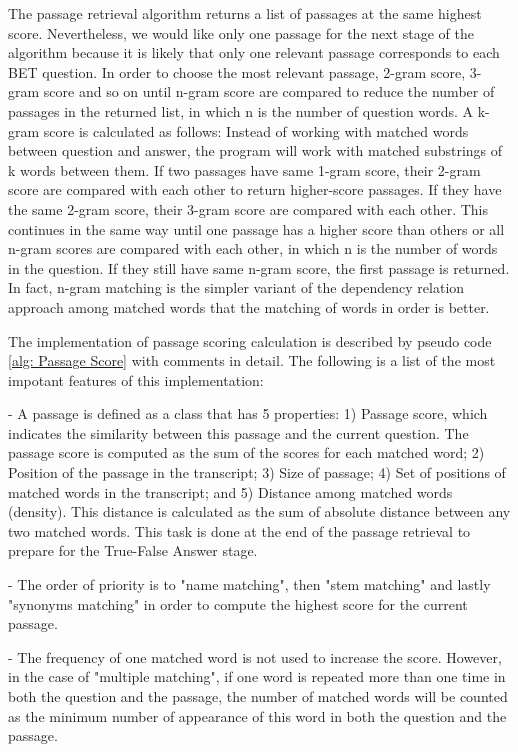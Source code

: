 The passage retrieval algorithm returns a list of passages at the same highest score. Nevertheless, we would like only one passage for the next stage of the algorithm because it is likely that only one relevant passage corresponds to each BET question. In order to choose the most relevant passage, 2-gram score, 3-gram score and so on until n-gram score are compared to reduce the number of passages in the returned list, in which n is the number of question words. A k-gram score is calculated as follows: Instead of working with matched words between question and answer, the program will work with matched substrings of k words between them. If two passages have same 1-gram score, their 2-gram score are compared with each other to return higher-score passages. If they have the same 2-gram score, their 3-gram score are compared with each other. This continues in the same way until one passage has a higher score than others or all n-gram scores are compared with each other, in which n is the number of words in the question. If they still have same n-gram score, the first passage is returned. In fact, n-gram matching is the simpler variant of the dependency relation approach among matched words that the matching of words in order is better.



The implementation of passage scoring calculation is described by pseudo code \ref{alg: Passage Score} with comments in detail. The following is a list of the most impotant features of this implementation:

- A passage is defined as a class that has 5 properties: 1) Passage score, which indicates the similarity between this passage and the current question. The passage score is computed as the sum of the scores for each matched word; 2) Position of the passage in the transcript; 3) Size of passage; 4) Set of positions of matched words in the transcript; and 5) Distance among matched words (density). This distance is calculated as the sum of absolute distance between any two matched words. This task is done at the end of the passage retrieval to prepare for the True-False Answer stage.


- The order of priority is to "name matching", then "stem matching" and lastly "synonyms matching" in order to compute the highest score for the current passage.

- The frequency of one matched word is not used to increase the score. However, in the case of "multiple matching", if one word is repeated more than one time in both the question and the passage, the number of matched words will be counted as the minimum number of appearance of this word in both the question and the passage. 



